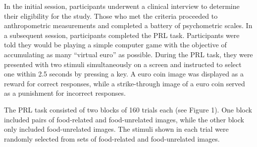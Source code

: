 \documentclass[
  man,floatsintext]{apa6}
\begin{document}
In the initial session, participants underwent a clinical interview to determine their eligibility for the study. Those who met the criteria proceeded to anthropometric measurements and completed a battery of psychometric scales. In a subsequent session, participants completed the PRL task. Participants were told they would be playing a simple computer game with the objective of accumulating as many ``virtual euro'' as possible. During the PRL task, they were presented with two stimuli simultaneously on a screen and instructed to select one within 2.5 seconds by pressing a key. A euro coin image was displayed as a reward for correct responses, while a strike-through image of a euro coin served as a punishment for incorrect responses.

The PRL task consisted of two blocks of 160 trials each (see Figure 1). One block included pairs of food-related and food-unrelated images, while the other block only included food-unrelated images. The stimuli shown in each trial were randomly selected from sets of food-related and food-unrelated images.
\end{document}

